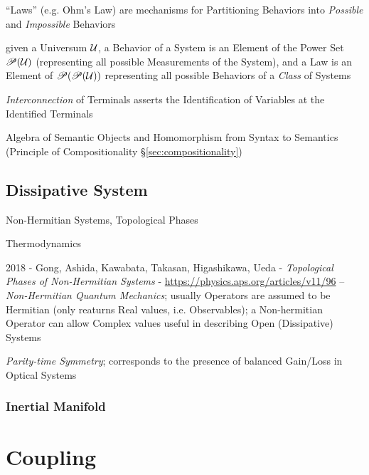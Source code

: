 
``Laws'' (e.g. Ohm's Law) are mechanisms for Partitioning Behaviors
into \emph{Possible} and \emph{Impossible} Behaviors

given a Universum $\mathcal{U}$, a Behavior of a System is an Element
of the Power Set $\mathscr{P}(\mathcal{U})$ (representing all possible
Measurements of the System), and a Law is an Element of
$\mathscr{P}(\mathscr{P}(\mathcal{U}))$ representing all possible Behaviors of a
\emph{Class} of Systems

\emph{Interconnection} of Terminals asserts the Identification of
Variables at the Identified Terminals

Algebra of Semantic Objects and Homomorphism from Syntax to Semantics
(Principle of Compositionality \S\ref{sec:compositionality})



\subsection{Dissipative System}\label{sec:dissipative_system}

Non-Hermitian Systems, Topological Phases

Thermodynamics

2018 - Gong, Ashida, Kawabata, Takasan, Higashikawa, Ueda -
\emph{Topological Phases of Non-Hermitian Systems} -
\url{https://physics.aps.org/articles/v11/96}
-- \emph{Non-Hermitian Quantum Mechanics}; usually Operators are assumed to be
Hermitian (only reaturns Real values, i.e. Observables); a Non-hermitian
Operator can allow Complex values useful in describing Open (Dissipative)
Systems

\emph{Parity-time Symmetry}; corresponds to the presence of balanced Gain/Loss
in Optical Systems



\subsubsection{Inertial Manifold}\label{sec:intertial_manifold}



\section{Coupling}\label{sec:coupling}


